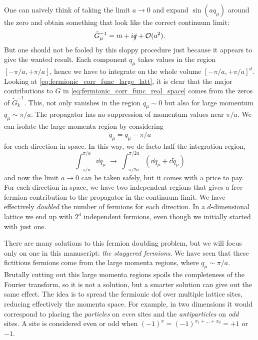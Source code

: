 One can naively think of taking the limit $a \to 0$ and expand $\sin(a q_{\mu})$ around the zero and obtain something that look like the correct continuum limit:
\begin{equation}
    \tilde{G}_{\mu}^{-1} = m + i \slashed{q} + \mathcal{O}(a^2).
\end{equation}
But one should not be fooled by this sloppy procedure just because it appears to give the wanted result.
Each component $q_{\mu}$ takes values in the region $[-\pi/a, +\pi/a]$, hence we have to integrate on the whole volume $[-\pi/a, +\pi/a]^d$.
Looking at \eqref{eq:fermionic_corr_func_large_latt}, it is clear that the major contributions to $G$ in \eqref{eq:fermionic_corr_func_real_space} comes from the zeros of $\tilde{G}_k^{-1}$.
This, not only vanishes in the region $q_{\mu} \sim 0$ but also for large momentum $q_{\mu} \sim \pi/a$.
The propagator has no suppression of momentum values near $\pi/a$.
We can isolate the large momenta region by considering
\begin{equation}
    \tilde{q}_{\mu} = q_{\mu} - \pi/a
\end{equation}
for each direction in space.
In this way, we de facto half the integration region,
\begin{equation}
    \int_{-\pi/a}^{\pi/a} \dd q_{\mu} \;\to\;
    \int_{-\pi/2a}^{\pi/2a} (\dd q_{\mu} + \dd \tilde{q}_{\mu})
\end{equation}
and now the limit $a \to 0$ can be taken safely, but it comes with a price to pay.
For each direction in space, we have two independent regions that gives a free fermion contribution to the propagator in the continuum limit.
We have effectively \emph{doubled} the number of fermions for each direction.
In a $d$-dimensional lattice we end up with $2^d$ independent fermions, even though we initially started with just one.

There are many solutions to this fermion doubling problem\citneeded, but we will focus only on one in this manuscript: \emph{the staggered fermions}\citneeded.
We have seen that these fictitious fermions come from the large momenta regions, where $q_{\mu} \sim \pi/a$.
Brutally cutting out this large momenta regions spoils the completeness of the Fourier transform, so it is not a solution, but a smarter solution can give out the same effect.
The idea is to spread the fermionic \ac{dof} over multiple lattice sites, reducing effectively the momenta space.
For example, in two dimensions it would correspond to placing the \emph{particles} on \emph{even} sites and the \emph{antiparticles} on \emph{odd} sites.
A site is considered even or odd when $(-1)^x = (-1)^{x_1 + \dots + x_d} = +1$ or $-1$.

